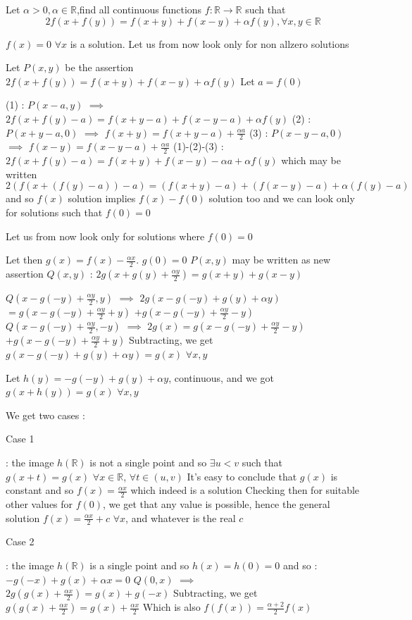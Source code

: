 \begin{solution}
	\begin{tcolorbox}Let $\alpha >0,\alpha \in\mathbb{R}$,find all  continuous functions $f:\mathbb{R}\to\mathbb{R}$ such that \[ 2 f(x+f(y))=f(x+y)+f(x-y)+\alpha f(y),\forall x,y\in \mathbb{R}\] \end{tcolorbox}
$\boxed{f(x)=0}$ $\forall x$ is a solution.
Let us from now look only for non allzero solutions

Let $P(x,y)$ be the assertion $2f(x+f(y))=f(x+y)+f(x-y)+\alpha f(y)$
Let $a=f(0)$

(1) : $P(x-a,y)$ $\implies$ $2f(x+f(y)-a)=f(x+y-a)+f(x-y-a)+\alpha f(y)$
(2) : $P(x+y-a,0)$ $\implies$ $f(x+y)=f(x+y-a)+\frac{\alpha a}2$
(3) : $P(x-y-a,0)$ $\implies$ $f(x-y)=f(x-y-a)+\frac{\alpha a}2$
(1)-(2)-(3) : $2f(x+f(y)-a)=f(x+y)+f(x-y)-\alpha a+\alpha f(y)$
which may be written $2(f(x+(f(y)-a))-a)=(f(x+y)-a)+(f(x-y)-a)+\alpha(f(y)-a)$
and so $f(x)$ solution implies $f(x)-f(0)$ solution too and we can look only for solutions such that $f(0)=0$

Let us from now look only for solutions where $f(0)=0$

Let then $g(x)=f(x)-\frac{\alpha x}2$. 
$g(0)=0$
$P(x,y)$ may be written as new assertion $Q(x,y)$ : $2g(x+g(y)+\frac{\alpha y}2)=g(x+y)+g(x-y)$

$Q(x-g(-y)+\frac{\alpha y}2,y)$ $\implies$ $2g(x-g(-y)+g(y)+\alpha y)$ $=g(x-g(-y)+\frac{\alpha y}2+y)$ $+g(x-g(-y)+\frac{\alpha y}2-y)$
$Q(x-g(-y)+\frac{\alpha y}2,-y)$ $\implies$ $2g(x)=g(x-g(-y)+\frac{\alpha y}2-y)$ $+g(x-g(-y)+\frac{\alpha y}2+y)$
Subtracting, we get $g(x-g(-y)+g(y)+\alpha y)=g(x)$ $\forall x,y$

Let $h(y)=-g(-y)+g(y)+\alpha y$, continuous, and we got $g(x+h(y))=g(x)$ $\forall x,y$

We get two cases :

\begin{bolded}Case 1\end{bolded}: the image $h(\mathbb R)$ is not a single point and so $\exists u<v$ such that $g(x+t)=g(x)$ $\forall x\in\mathbb R$, $\forall t\in(u,v)$
It's easy to conclude that $g(x)$ is constant and so $f(x)=\frac{\alpha x}2$ which indeed is a solution
Checking then for suitable other values for $f(0)$, we get that any value is possible, hence the general solution $\boxed{f(x)=\frac{\alpha x}2+c}$ $\forall x$, and whatever is the real $c$

\begin{bolded}Case 2\end{bolded}: the image $h(\mathbb R)$ is a single point and so $h(x)=h(0)=0$ and so :
$-g(-x)+g(x)+\alpha x=0$
$Q(0,x)$ $\implies$ $2g(g(x)+\frac{\alpha x}2)=g(x)+g(-x)$
Subtracting, we get $g(g(x)+\frac{\alpha x}2)=g(x)+\frac{\alpha x}2$
Which is also $f(f(x))=\frac{\alpha+2}2f(x)$


\end{solution}
